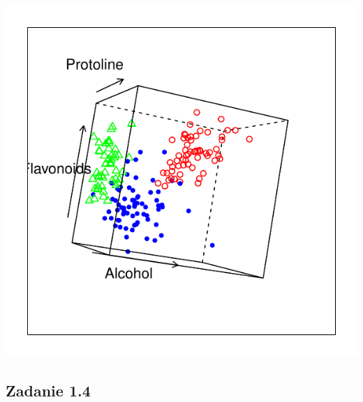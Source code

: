 \documentclass[10pt,a4paper]{article}\usepackage[]{graphicx}\usepackage[]{color}
\makeatletter
\def\maxwidth{ %
  \ifdim\Gin@nat@width>\linewidth
    \linewidth
  \else
    \Gin@nat@width
  \fi
}
\newenvironment{knitrout}{}{} %
\makeatother
\begin{document}
\begin{knitrout}
{\centering \includegraphics[width=\maxwidth]{figure/unnamed-chunk-7} 

}



\end{knitrout}


\subsection*{Zadanie 1.4}
\end{document}
